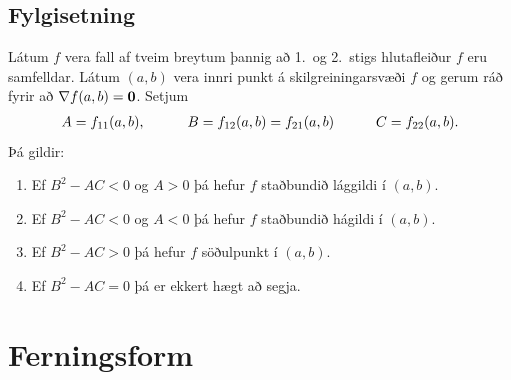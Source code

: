 \documentclass[a4paper,10pt,icelandic]{sphinxmanual}
\begin{document}
\subsection{Fylgisetning}
\label{Kafli3:fylgisetning}
Látum \(f\) vera fall af tveim breytum þannig að 1. og 2. stigs
hlutafleiður \(f\) eru samfelldar. Látum \((a,b)\) vera innri
punkt á skilgreiningarsvæði \(f\) og gerum ráð fyrir að
\(\nabla
f(a,b)=\mbox{${\bf 0}$}\). Setjum
\begin{gather}
\begin{split}A=f_{11}(a,b),\qquad\quad B=f_{12}(a,b)=f_{21}(a,b)\qquad\quad
C=f_{22}(a,b).\end{split}\notag
\end{gather}
Þá gildir:
\begin{enumerate}
\item {} 
Ef \(B^2-AC<0\) og \(A>0\) þá hefur \(f\) staðbundið
lággildi í \((a,b)\).

\item {} 
Ef \(B^2-AC<0\) og \(A<0\) þá hefur \(f\) staðbundið
hágildi í \((a,b)\).

\item {} 
Ef \(B^2-AC>0\) þá hefur \(f\) söðulpunkt í \((a,b)\).

\item {} 
Ef \(B^2-AC=0\) þá er ekkert hægt að segja.

\end{enumerate}


\section{Ferningsform}
\label{Kafli3:ferningsform}
\end{document}
